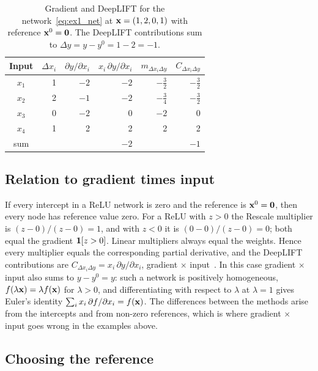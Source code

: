 \begin{table}[t]
  \centering
  \caption{Gradient and DeepLIFT for the network~\eqref{eq:ex1_net} at $\mathbf{x}=(1,2,0,1)$ with reference $\mathbf{x}^0=\mathbf{0}$. The DeepLIFT contributions sum to $\Delta y=y-y^0=1-2=-1$.}
  \label{tab:deeplift_example}
  \begin{tabular}{crrrrr}
    \toprule
    Input & $\Delta x_i$ & $\partial y/\partial x_i$ & $x_i\,\partial y/\partial x_i$ & $m_{\Delta x_i\Delta y}$ & $C_{\Delta x_i\Delta y}$ \\
    \midrule
    $x_1$ & 1 & $-2$ & $-2$ & $-\frac32$ & $-\frac32$ \\[1pt]
    $x_2$ & 2 & $-1$ & $-2$ & $-\frac34$ & $-\frac32$ \\[1pt]
    $x_3$ & 0 & $-2$ & 0 & $-2$ & 0 \\
    $x_4$ & 1 & 2 & 2 & 2 & 2 \\
    \midrule
    sum & & & $-2$ & & $-1$ \\
    \bottomrule
  \end{tabular}
\end{table}

\subsection{Relation to gradient times input}

If every intercept in a ReLU network is zero and the reference is $\mathbf{x}^0=\mathbf{0}$, then every node has reference value zero. For a ReLU with $z>0$ the Rescale multiplier is $(z-0)/(z-0)=1$, and with $z<0$ it is $(0-0)/(z-0)=0$; both equal the gradient $\mathbf{1}[z>0]$. Linear multipliers always equal the weights. Hence every multiplier equals the corresponding partial derivative, and the DeepLIFT contributions are $C_{\Delta x_i\Delta y}=x_i\,\partial y/\partial x_i$, gradient $\times$ input~\citep{shrikumar2017,ancona2018}. In this case gradient $\times$ input also sums to $y-y^0=y$: such a network is positively homogeneous, $f(\lambda\mathbf{x})=\lambda f(\mathbf{x})$ for $\lambda>0$, and differentiating with respect to $\lambda$ at $\lambda=1$ gives Euler's identity $\sum_i x_i\,\partial f/\partial x_i=f(\mathbf{x})$. The differences between the methods arise from the intercepts and from non-zero references, which is where gradient $\times$ input goes wrong in the examples above.

\subsection{Choosing the reference}

